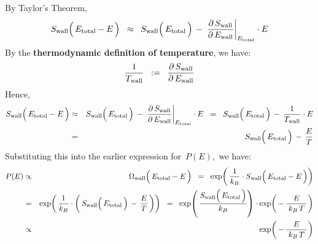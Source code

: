 By Taylor's Theorem,
\begin{equation*}
S_{\textnormal{wall}}\!\left(\,\overset{{\color{white}.}}{
    E_{\textnormal{total}}-E
    }\,\right)
\;\; \approx \;\;
    S_{\textnormal{wall}}\!\left(\,\overset{{\color{white}.}}{
        E_{\textnormal{total}}
        }\,\right)
    \,-\,
    \left.\dfrac{\partial\,S_{\textnormal{wall}}}{\partial\,E_{\textnormal{wall}}}\right\vert_{E_{\textnormal{total}}}
    \cdot
    E
\end{equation*}
By the \textbf{\color{red}thermodynamic definition of temperature}, we have:
{\color{red}
\begin{equation*}
\dfrac{1}{T_{\textnormal{wall}}}
\;\; := \;\;
    \dfrac{\partial\,S_{\textnormal{wall}}}{\partial\,E_{\textnormal{wall}}}
\end{equation*}
}
Hence,
\begin{eqnarray*}
S_{\textnormal{wall}}\!\left(\,\overset{{\color{white}.}}{
    E_{\textnormal{total}}-E
    }\,\right)
& \approx &
    S_{\textnormal{wall}}\!\left(\,\overset{{\color{white}.}}{
        E_{\textnormal{total}}
        }\,\right)
    \,-\,
    \left.\dfrac{\partial\,S_{\textnormal{wall}}}{\partial\,E_{\textnormal{wall}}}\right\vert_{E_{\textnormal{total}}}
    \cdot
    E
\;\; = \;\;
    S_{\textnormal{wall}}\!\left(\,\overset{{\color{white}.}}{
        E_{\textnormal{total}}
        }\,\right)
    \,-\,
    \dfrac{1}{T_{\textnormal{wall}}} \cdot E
\\
& = &
    S_{\textnormal{wall}}\!\left(\,\overset{{\color{white}.}}{
        E_{\textnormal{total}}
        }\,\right)
    \,-\,
    \dfrac{E}{T}
\end{eqnarray*}
Substituting this into the earlier expression for \,$P(E)$,\, we have:
\begin{eqnarray*}
P(E)
& \propto &
    \Omega_{\textnormal{wall}}\!\left(\,\overset{{\color{white}.}}{
        E_{\textnormal{total}}-E
        }\,\right)
\;\; = \;\;
    \exp\!\left(\,
        \dfrac{1}{k_{B}}
        \cdot
        S_{\textnormal{wall}}\!\left(\,\overset{{\color{white}.}}{
            E_{\textnormal{total}}-E
            }\,\right)
        \right)
\\
& = &
    \exp\!\left(\,
        \dfrac{1}{k_{B}}
        \cdot
        \left(\,
            S_{\textnormal{wall}}\!\left(\,\overset{{\color{white}.}}{
                E_{\textnormal{total}}
                }\,\right)
            \,-\,
            \dfrac{E}{T}
            \,\right)
        \right)
\;\; = \;\;
    \exp\!\left(\,
        \dfrac{
            S_{\textnormal{wall}}\!\left(\,\overset{{\color{white}.}}{
                E_{\textnormal{total}}
                }\,\right)
            }{
            k_{B}
            }
        \right)
    \cdot
    \exp\!\left(\,
        -\,\dfrac{E}{
            {\color{white}.}
            k_{B}\,T
            {\color{white}.}
            }
        \right)
\\
& \propto &
    \exp\!\left(\,
        -\,\dfrac{E}{
            {\color{white}.}
            k_{B}\,T
            {\color{white}.}
            }
        \right)
\end{eqnarray*}

